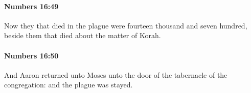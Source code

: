		\paragraph{Numbers 16:49} %
			\label{NUMBERS-16-49}

			Now they that died in the plague were fourteen thousand and seven hundred, beside them that died about the matter of Korah.


		\paragraph{Numbers 16:50} %
			\label{NUMBERS-16-50}

			And Aaron returned unto Moses unto the door of the tabernacle of the congregation: and the plague was stayed.

